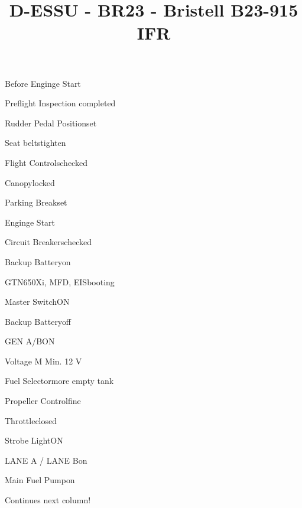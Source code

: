 \def\papersize{5}




\title{D-ESSU  -  BR23  -  Bristell B23-915 IFR}

\begin{checklist}{Before Enginge Start}
  \item{Preflight Inspection  }{completed}
  \item{Rudder Pedal Position}{set}
  \item{Seat belts}{tighten}
  \item{Flight Controls}{checked}
  \item{Canopy}{locked}
  \item{Parking Break}{set}
\end{checklist}

\begin{checklist}{Enginge Start}
  \item{Circuit Breakers}{checked}
  \item{Backup Battery}{on}
  \item{GTN650Xi, MFD, EIS}{booting}

  \item{Master Switch}{ON}


  \item{Backup Battery}{off}
  \item{GEN A/B}{ON}
  \item{Voltage M }{Min. 12 V}
  \item{Fuel Selector}{more empty tank}
  \item{Propeller Control}{fine}
  \item{Throttle}{closed}
  \item{Strobe Light}{ON}
  \item{LANE A / LANE B}{on}
  \item{Main Fuel Pump}{on} 

Continues next column!
\end{checklist}

